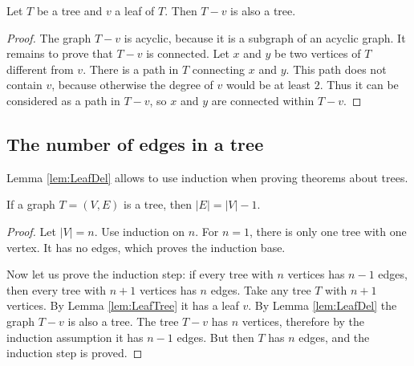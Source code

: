 \begin{page}

\begin{lem}
\label{lem:LeafDel}
Let $T$ be a tree and $v$ a leaf of $T$.
Then $T - v$ is also a tree.
\end{lem}

\end{page}

\begin{page}

\begin{proof}
The graph $T - v$ is acyclic, because it is a subgraph of an acyclic graph.
It remains to prove that $T - v$ is connected.
Let $x$ and $y$ be two vertices of $T$ different from $v$.
There is a path in $T$ connecting $x$ and $y$.
This path does not contain $v$, because otherwise the degree of $v$ would be at least $2$.
Thus it can be considered as a path in $T - v$, so $x$ and $y$ are connected within $T - v$.
\end{proof}



\end{page}

\begin{page}

\subsection{The number of edges in a tree}
Lemma \ref{lem:LeafDel} allows to use induction when proving theorems about trees.


\end{page}

\begin{page}

\begin{thm}
\label{thm:TreeEdges}
If a graph $T = (V, E)$ is a tree, then $|E| = |V| - 1$.
\end{thm}

\end{page}

\begin{page}

\begin{proof}
Let $|V| = n$.
Use induction on $n$.
For $n=1$, there is only one tree with one vertex.
It has no edges, which proves the induction base.

Now let us prove the induction step: if every tree with $n$ vertices has $n-1$ edges, then every tree with $n+1$ vertices has $n$ edges.
Take any tree $T$ with $n+1$ vertices.
By Lemma \ref{lem:LeafTree} it has a leaf $v$.
By Lemma \ref{lem:LeafDel} the graph $T - v$ is also a tree.
The tree $T - v$ has $n$ vertices, therefore by the induction assumption it has $n-1$ edges.
But then $T$ has $n$ edges, and the induction step is proved.
\end{proof}


\end{page}

